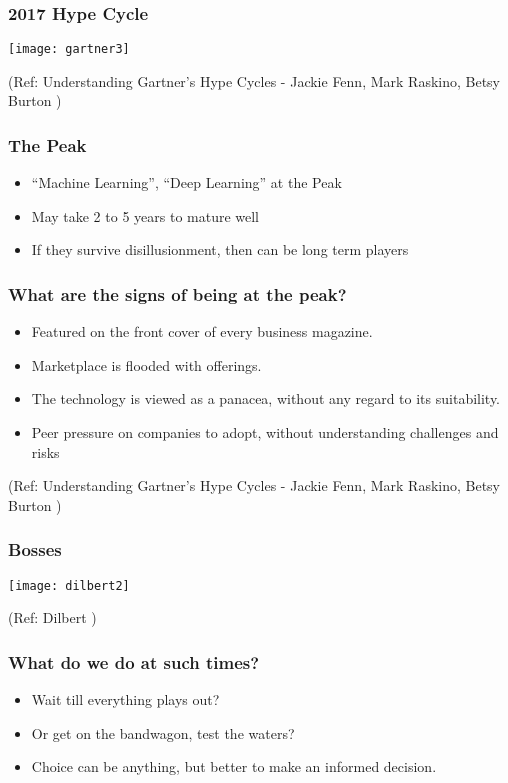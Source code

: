 \begin{frame}[fragile]\frametitle{2017 Hype Cycle}
\begin{center}
\texttt{[image: gartner3]}
\end{center}
{\tiny (Ref: Understanding Gartner's Hype Cycles - Jackie Fenn, Mark Raskino, Betsy Burton )}
\end{frame}


\begin{frame}[fragile]\frametitle{The Peak}
\begin{itemize}
\item ``Machine Learning'', ``Deep Learning'' at the Peak
\item May take 2 to 5 years to mature well
\item If they survive disillusionment, then can be long term players
\end{itemize}
\end{frame}


\begin{frame}[fragile]\frametitle{What are the signs of being at the peak?}
\begin{itemize}
\item Featured on the front cover of every business magazine.
\item Marketplace is flooded with offerings.
\item  The technology is viewed as a panacea, without any regard to its
suitability.
\item Peer pressure on companies to adopt, without understanding challenges and risks
\end{itemize}
{\tiny (Ref: Understanding Gartner's Hype Cycles - Jackie Fenn, Mark Raskino, Betsy Burton )}
\end{frame}

\begin{frame}[fragile]\frametitle{Bosses}
\begin{center}
\texttt{[image: dilbert2]}
\end{center}
{\tiny (Ref: Dilbert )}
\end{frame}

\begin{frame}[fragile]\frametitle{What do we do at such times?}
\begin{itemize}
\item Wait till everything plays out?
\item Or get on the bandwagon, test the waters?
\item Choice can be anything, but better to make an informed decision.
\end{itemize}
\end{frame}

